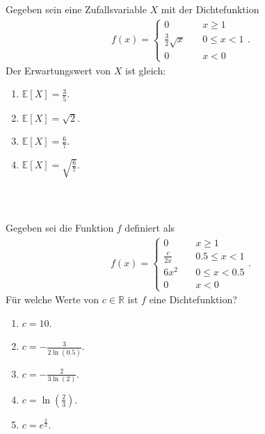 \subsection*{}
Gegeben sein eine Zufallsvariable $ X $ mit der Dichtefunktion
\begin{align*}
	f(x)
	=
	\begin{cases}
		0 \quad &x \geq 1\\
		\frac{3}{2} \sqrt{x} \quad &0 \leq x < 1\\
		0 \quad &x<0
	\end{cases}.
\end{align*}
Der Erwartungswert von $ X $ ist gleich:
\renewcommand{\labelenumi}{(\alph{enumi})}
\begin{enumerate}
	\item 
	$\mathbb{E}[X] = \frac{3}{5}$.
	\item
	$\mathbb{E}[X] = \sqrt{2}$.
	\item
	$\mathbb{E}[X] = \frac{6}{7}$.
	\item
	$\mathbb{E}[X] = \sqrt{\frac{6}{7}}$.
\end{enumerate}
\ \\
\subsection*{}
Gegeben sei die Funktion $ f $ definiert als
\begin{align*}
	f(x)
	=
	\begin{cases}
		0 \quad &x \geq 1\\
		\frac{c}{2x} \quad &0.5 \leq x < 1\\
		6x^2 \quad &0 \leq x < 0.5\\
		0 \quad &x<0
	\end{cases}.
\end{align*}
Für welche Werte von $ c \in \mathbb{R} $ ist $ f $ eine Dichtefunktion?
\renewcommand{\labelenumi}{(\alph{enumi})}
\begin{enumerate}
\item 
$ c = 10$.
\item 
$ c= -\frac{3}{2 \ln(0.5)} $.
\item
$ c= -\frac{2}{3 \ln(2)} $.
\item
$ c = \ln \left(\frac{2}{3}\right) $.
\item
$ c = e^{\frac{2}{3}} $.
\end{enumerate}

\newpage
